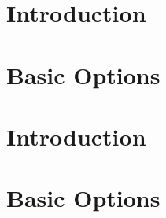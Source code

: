 \documentclass[
    ,title     = {{Decomposition of natural images}}
    ,longtitle
    ,highlight = dtured
    ,toplogo   = {{template/tex_dtu_compute_b_uk}}
    ,botlogo   = {{template/tex_dtu_frise}}
    ,papersize = {{a0paper}}
    ,colcount  = {{3columns}}
]{dtuposter}
\begin{document}
\begin{dtuposterhead} %
\end{dtuposterhead}
%
%
\begin{dtupostercontent}
\section{Introduction}
\section{Basic Options}

\section{Introduction}
\section{Basic Options}



\end{dtupostercontent}
\end{document}
